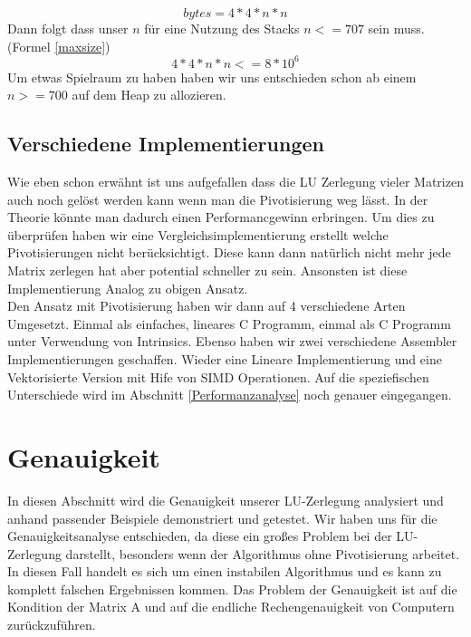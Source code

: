 \documentclass[course=erap]{aspdoc}
\begin{document}
 \begin{equation}
 \label{size}
  bytes = 4*4*n*n
 \end{equation}
Dann folgt dass unser $n$ für eine Nutzung des Stacks  $n <= 707$  sein muss.(Formel \ref{maxsize})
 \begin{equation}
 \label{maxsize}
  4*4*n*n <= 8*10^6
 \end{equation}
 Um etwas Spielraum zu haben haben wir uns entschieden schon ab einem $n >= 700$ auf dem Heap zu allozieren.\\


\subsection{Verschiedene Implementierungen}
Wie eben schon erwähnt ist uns aufgefallen dass die LU Zerlegung vieler Matrizen auch noch gelöst werden kann wenn man die Pivotisierung weg lässt. In der Theorie könnte man dadurch einen Performancgewinn erbringen. 
Um dies zu überprüfen haben wir eine Vergleichsimplementierung erstellt welche Pivotisierungen nicht berücksichtigt. Diese kann dann natürlich nicht mehr jede Matrix zerlegen hat aber potential schneller zu sein.
  Ansonsten ist diese Implementierung Analog zu obigen Ansatz.\\
  
Den Ansatz mit Pivotisierung haben wir dann auf 4 verschiedene Arten Umgesetzt. Einmal als einfaches, lineares C Programm, einmal als C Programm unter Verwendung von Intrinsics.
 Ebenso haben wir zwei verschiedene Assembler Implementierungen geschaffen. Wieder eine Lineare Implementierung und eine Vektorisierte Version mit Hife von SIMD Operationen.
 Auf die speziefischen Unterschiede wird im Abschnitt \ref{Performanzanalyse} noch genauer eingegangen.


\section{Genauigkeit}
In diesen Abschnitt wird die Genauigkeit unserer LU-Zerlegung analysiert und anhand
 passender Beispiele demonstriert und getestet. Wir haben uns für die 
Genauigkeitsanalyse entschieden, da diese ein großes Problem bei der LU-Zerlegung
 darstellt, besonders wenn der Algorithmus ohne Pivotisierung arbeitet. In diesen Fall 
handelt es sich um einen instabilen Algorithmus und es kann zu komplett 
falschen Ergebnissen kommen. Das Problem der Genauigkeit ist auf die Kondition der 
Matrix A und auf die endliche Rechengenauigkeit von Computern zurückzuführen. \\
\end{document}
